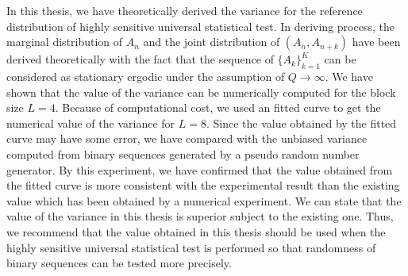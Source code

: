 In this thesis, we have theoretically derived the variance for the reference distribution of highly sensitive universal statistical test. 
%
In deriving process, the marginal distribution of $A_n$ and the joint distribution of $(A_n,A_{n+k})$ have been derived theoretically with the fact that the sequence of $\{A_k\}_{k=1}^{K}$ can be considered as stationary ergodic under the assumption of $Q\to\infty$. 
%
We have shown that the value of the variance can be numerically computed for the block size $L=4$.
%
Because of computational cost, we used an fitted curve to get the numerical value of the variance for $L=8$.
%
Since the value obtained by the fitted curve may have some error, we have compared with the unbiased variance computed from binary sequences generated by a pseudo random number generator. By this experiment, we have confirmed that the value obtained from the fitted curve is more consistent with the experimental result than the existing value which has been obtained by a numerical experiment.
%
We can state that the value of the variance in this thesis is superior subject to the existing one. 
%
Thus, we recommend that the value obtained in this thesis should be used when the highly sensitive universal statistical test is performed so that randomness of binary sequences can be tested more precisely.